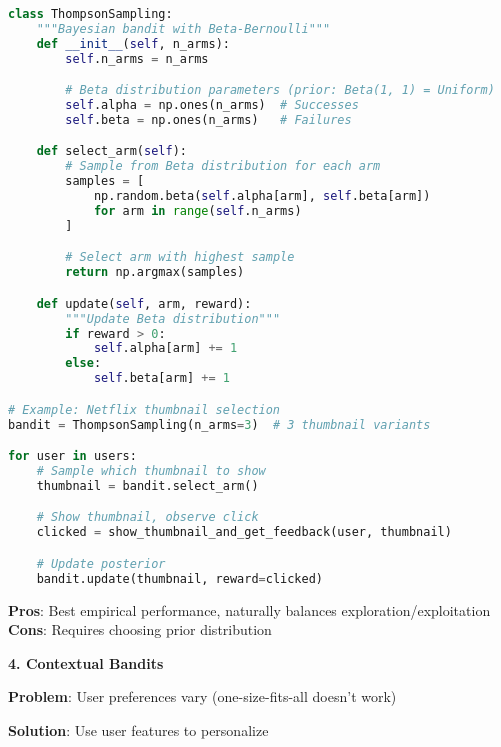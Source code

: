 \documentclass[10pt]{article}
\begin{document}
\begin{lstlisting}[language=Python]
class ThompsonSampling:
    """Bayesian bandit with Beta-Bernoulli"""
    def __init__(self, n_arms):
        self.n_arms = n_arms

        # Beta distribution parameters (prior: Beta(1, 1) = Uniform)
        self.alpha = np.ones(n_arms)  # Successes
        self.beta = np.ones(n_arms)   # Failures

    def select_arm(self):
        # Sample from Beta distribution for each arm
        samples = [
            np.random.beta(self.alpha[arm], self.beta[arm])
            for arm in range(self.n_arms)
        ]

        # Select arm with highest sample
        return np.argmax(samples)

    def update(self, arm, reward):
        """Update Beta distribution"""
        if reward > 0:
            self.alpha[arm] += 1
        else:
            self.beta[arm] += 1

# Example: Netflix thumbnail selection
bandit = ThompsonSampling(n_arms=3)  # 3 thumbnail variants

for user in users:
    # Sample which thumbnail to show
    thumbnail = bandit.select_arm()

    # Show thumbnail, observe click
    clicked = show_thumbnail_and_get_feedback(user, thumbnail)

    # Update posterior
    bandit.update(thumbnail, reward=clicked)
\end{lstlisting}

\textbf{Pros}: Best empirical performance, naturally balances exploration/exploitation \\
\textbf{Cons}: Requires choosing prior distribution

\textbf{4. Contextual Bandits}

\textbf{Problem}: User preferences vary (one-size-fits-all doesn't work)

\textbf{Solution}: Use user features to personalize
\end{document}
